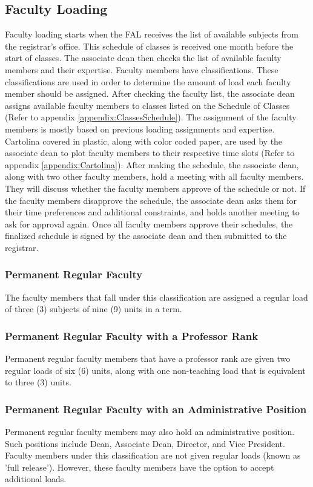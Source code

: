 \subsection{Faculty Loading}
Faculty loading starts when the FAL receives the list of available subjects from the registrar's office. This schedule of classes is received one month before the start of classes. The associate dean then checks the list of available faculty members and their expertise. Faculty members have classifications. These classifications are used in order to determine the amount of load each faculty member should be assigned. After checking the faculty list, the associate dean assigns available faculty members to classes listed on the Schedule of Classes (Refer to appendix \ref{appendix:ClassesSchedule}). The assignment of the faculty members is mostly based on previous loading assignments and expertise. Cartolina covered in plastic, along with color coded paper, are used by the associate dean to plot faculty members to their respective time slots (Refer to appendix \ref{appendix:Cartolina}). After making the schedule, the associate dean, along with two other faculty members, hold a meeting with all faculty members. They will discuss whether the faculty members approve of the schedule or not. If the faculty members disapprove the schedule, the associate dean asks them for their time preferences and additional constraints, and holds another meeting to ask for approval again. Once all faculty members approve their schedules, the finalized schedule is signed by the associate dean and then submitted to the registrar.

\subsubsection{Permanent Regular Faculty}
The faculty members that fall under this classification are assigned a regular load of three (3) subjects of nine (9) units in a term.

\subsubsection{Permanent Regular Faculty with a Professor Rank}
Permanent regular faculty members that have a professor rank are given two regular loads of six (6) units, along with one non-teaching load that is equivalent to three (3) units.

\subsubsection{Permanent Regular Faculty with an Administrative Position}
Permanent regular faculty members may also hold an administrative position. Such positions include Dean, Associate Dean, Director, and Vice President. Faculty members under this classification are not given regular loads (known as 'full release'). However, these faculty members have the option to accept additional loads.

